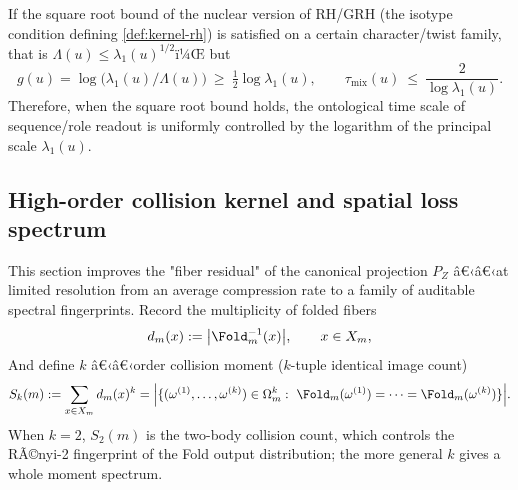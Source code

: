 \begin{corollary}[GRH-type square root bound \texorpdfstring{$\Rightarrow$}{=>} Universal upper bound for mixed scales]\label{cor:pom-grh-mix-upper}
If the square root bound of the nuclear version of RH/GRH (the isotype condition defining \ref{def:kernel-rh}) is satisfied on a certain character/twist family, that is
\(
\Lambda(u)\le \lambda_1(u)^{1/2}
\)ï¼Œ
but
\[
g(u)=\log\!\bigl(\lambda_1(u)/\Lambda(u)\bigr)\ \ge\ \tfrac12\log\lambda_1(u),
\qquad
\tau_{\mathrm{mix}}(u)\ \le\ \frac{2}{\log\lambda_1(u)}.
\]
Therefore, when the square root bound holds, the ontological time scale of sequence/role readout is uniformly controlled by the logarithm of the principal scale $\lambda_1(u)$.
\end{corollary}

\subsection{High-order collision kernel and spatial loss spectrum}\label{subsec:pom-higher-collision-spectrum}
This section improves the "fiber residual" of the canonical projection $P_Z$ â€‹â€‹at limited resolution from an average compression rate to a family of auditable spectral fingerprints. Record the multiplicity of folded fibers
$$
d_m(x):=\bigl|\Fold_m^{-1}(x)\bigr|,\qquad x\in X_m,
$$
And define $k$ â€‹â€‹order collision moment ($k$-tuple identical image count)
$$
S_k(m):=\sum_{x\in X_m} d_m(x)^k
=\Bigl|\{(\omega^{(1)},\dots,\omega^{(k)})\in\Omega_m^k:\ \Fold_m(\omega^{(1)})=\cdots=\Fold_m(\omega^{(k)})\}\Bigr|.
$$
When $k=2$, $S_2(m)$ is the two-body collision count, which controls the RÃ©nyi-2 fingerprint of the Fold output distribution; the more general $k$ gives a whole moment spectrum.

